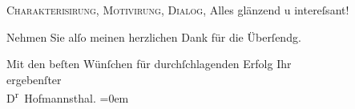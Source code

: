                   \textsc{Charakterisirung}, \textsc{Motivirung},
                  \textsc{Dialog}, Alles glänzend u intereſsant!\pend
           
\pstart
           Nehmen Sie alſo meinen herzlichen Dank für die Überſendg.\pend
           
\pstart
           Mit den beſten Wünſchen für durchſchlagenden Erfolg Ihr{\\[\baselineskip]}ergebenſter{\\[\baselineskip]}\spacefill\mbox{D\textsuperscript{r} Hofmannsthal.}\pend
           \leftskip=0em{}\endnumbering{}  \newcommand{\dateiname}{L00050}\newcommand{\titel}{Hugo August von Hofmannsthal an Arthur Schnitzler, 7. 12. 1891}\newcommand{\editorInnen}{Martin Anton Müller und Gerd-Hermann Susen}
